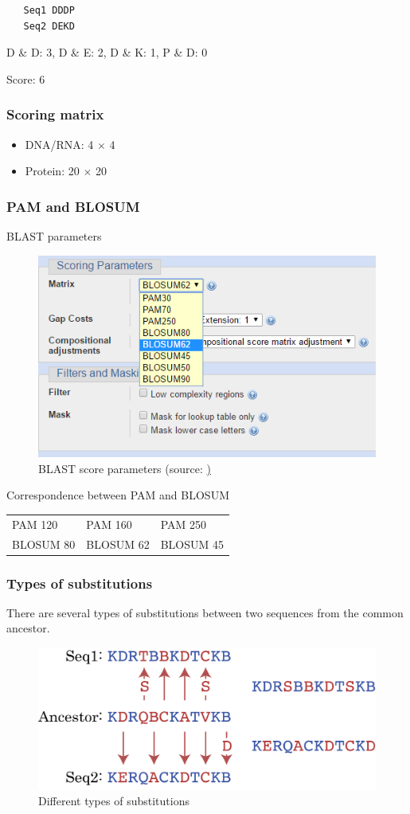 \begin{verbatim}
   Seq1 DDDP
   Seq2 DEKD
\end{verbatim}

D \& D: 3, D \& E: 2, D \& K: 1, P \& D: 0

Score: 6

%
%
\subsubsection*{Scoring matrix}
\begin{itemize}
\item DNA/RNA: 4 $\times$ 4
\item Protein: 20 $\times$ 20
\end{itemize}

%
%
\subsubsection*{PAM and BLOSUM}

BLAST parameters

\begin{figure}[H]
  \centering
      \includegraphics[width=0.6 \textwidth]{fig11/blast_pam_blosum.png}
  \caption{BLAST score parameters (source: \href{http://blast.ncbi.nlm.nih.gov})}
\end{figure}

\noindent
Correspondence between PAM and BLOSUM

\begin{table}[H]
\centering
\begin{tabular}{lll}
PAM 120    & PAM 160    & PAM 250    \\
BLOSUM 80 & BLOSUM 62 & BLOSUM 45
\end{tabular}
\end{table}

%
%
\subsubsection*{Types of substitutions}
There are several types of substitutions between two sequences from the common ancestor. 
\begin{figure}[H]
  \centering
      \includegraphics[width=0.6 \textwidth]{fig11/potential_mutations.png}
  \caption{Different types of substitutions}
\end{figure}

